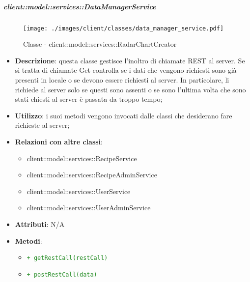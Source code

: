 		\subparagraph{client::model::services::DataManagerService} %
		\label{subp:radarchartcreator}
		\begin{figure}[htbp]
				\centering
				\centerline{\texttt{[image: ./images/client/classes/data\_manager\_service.pdf]}}
				\caption{Classe - client::model::services::RadarChartCreator}
			\end{figure}
			\begin{itemize}
				\item \textbf{Descrizione}: questa classe gestisce l'inoltro di chiamate REST al server. Se si tratta di chiamate Get controlla se i dati che vengono richiesti sono già presenti in locale o se devono essere richiesti al server. In particolare, li richiede al server solo se questi sono assenti o se sono l'ultima volta che sono stati chiesti al server è passata da troppo tempo;
				\item \textbf{Utilizzo}: i suoi metodi vengono invocati dalle classi che desiderano fare richieste al server;
				\item \textbf{Relazioni con altre classi}:
					\begin{itemize}
						\item client::model::services::RecipeService
						\item client::model::services::RecipeAdminService
						\item client::model::services::UserService
						\item client::model::services::UserAdminService
					\end{itemize}
				\item \textbf{Attributi}: N/A
				\item \textbf{Metodi}: 
				\begin{itemize}
					\item \textcolor{forestgreen}{\texttt{+ getRestCall(restCall)}}
					\item \textcolor{forestgreen}{\texttt{+ postRestCall(data)}}
\end{itemize}
\end{itemize}
